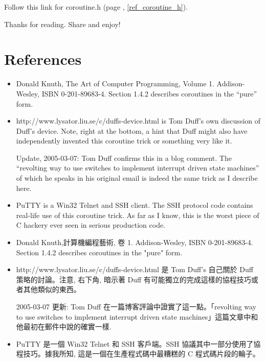 \documentclass[12pt]{article}
\begin{document}
\begin{CJK}{UTF8}{bsmi}
Follow this link for coroutine.h (page \pageref{ref_coroutine_h}, \ref{ref_coroutine_h}).


Thanks for reading. Share and enjoy!

\section{References}

\begin{itemize}
\item Donald Knuth, The Art of Computer Programming, Volume 1. Addison-Wesley, ISBN 0-201-89683-4. Section 1.4.2 describes coroutines in the ``pure'' form.

\item http://www.lysator.liu.se/c/duffs-device.html is Tom Duff's own discussion of Duff's device. Note, right at the bottom, a hint that Duff might also have independently invented this coroutine trick or something very like it.


Update, 2005-03-07: Tom Duff confirms this in a blog comment. The ``revolting way to use switches to implement interrupt driven state machines'' of which he speaks in his original email is indeed the same trick as I describe here.

\item PuTTY is a Win32 Telnet and SSH client. The SSH protocol code contains real-life use of this coroutine trick. As far as I know, this is the worst piece of C hackery ever seen in serious production code. 

\end{itemize}


\begin{itemize}
\item    Donald Knuth,計算機編程藝術, 卷 1. Addison-Wesley, ISBN 0-201-89683-4. Section 1.4.2 describes coroutines in the "pure" form.
\item        http://www.lysator.liu.se/c/duffs-device.html 是 Tom Duff's 自己關於 Duff 策略的討論。注意, 右下角, 暗示著 Duff 有可能獨立的完成這樣的協程技巧或者其他類似的東西。

2005-03-07 更新: Tom Duff 在一篇博客評論中證實了這一點。「revolting way to use switches to implement interrupt driven state machines」這篇文章中和他最初在郵件中說的確實一樣.
\item                PuTTY 是一個 Win32 Telnet 和 SSH 客戶端。SSH 協議其中一部分使用了協程技巧。據我所知, 這是一個在生產程式碼中最糟糕的
C 程式碼片段的輪子。
\end{itemize}





\end{CJK}
\end{document}
